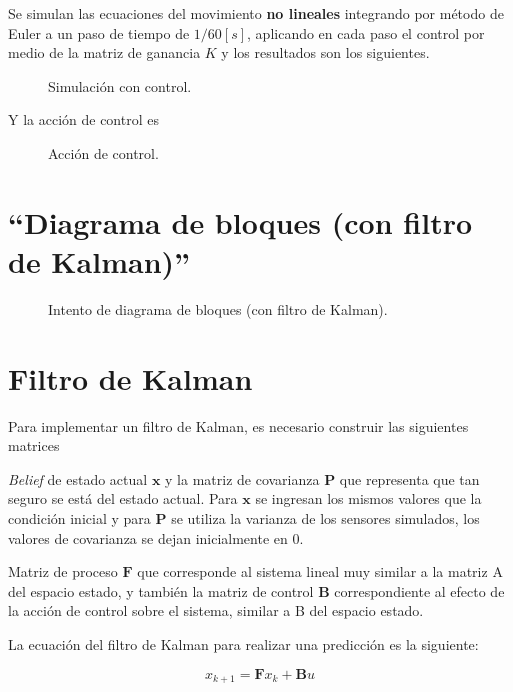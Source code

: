 \documentclass[titlepage, letterpaper]{article}
\begin{document}
Se simulan las ecuaciones del movimiento \textbf{no lineales} integrando por método de Euler a un paso de tiempo de $1/60 [s]$, aplicando en cada paso el control por medio de la matriz de ganancia $K$ y los resultados son los siguientes.

\begin{figure}[H]
	\centering
	
	\caption{Simulación con control.}
\end{figure}

Y la acción de control es

\begin{figure}[H]
	\centering
	
	\caption{Acción de control.}
\end{figure}

\section{“Diagrama de bloques (con filtro de Kalman)”}

\begin{figure}[H]
	\centering
	
	\caption{Intento de diagrama de bloques (con filtro de Kalman).}
\end{figure}

\section{Filtro de Kalman}

Para implementar un filtro de Kalman, es necesario construir las siguientes matrices

\emph{Belief} de estado actual $\pmb{x}$ y la matriz de covarianza $\pmb{P}$ que representa que tan seguro se está del estado actual. Para $\pmb{x}$ se ingresan los mismos valores que la condición inicial y para $\pmb{P}$ se utiliza la varianza de los sensores simulados, los valores de covarianza se dejan inicialmente en 0.

Matriz de proceso $\pmb{F}$ que corresponde al sistema lineal muy similar a la matriz A del espacio estado, y también la matriz de control $\pmb{B}$ correspondiente al efecto de la acción de control sobre el sistema, similar a B del espacio estado.

La ecuación del filtro de Kalman para realizar una predicción es la siguiente:

\begin{equation*}x_{k+1} = \pmb{F} x_{k} + \pmb{B} u\end{equation*}
\end{document}
